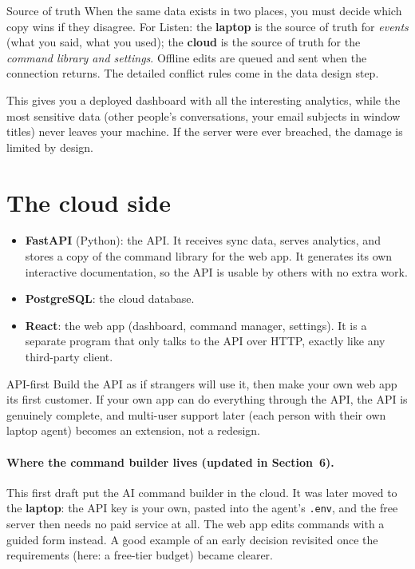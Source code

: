 \documentclass[11pt,a4paper]{article}
\begin{document}
\begin{concept}{Source of truth}
When the same data exists in two places, you must decide which copy wins if they disagree.
For Listen: the \textbf{laptop} is the source of truth for \emph{events} (what you said,
what you used); the \textbf{cloud} is the source of truth for the \emph{command library and
settings}. Offline edits are queued and sent when the connection returns. The detailed
conflict rules come in the data design step.
\end{concept}

\begin{why}
This gives you a deployed dashboard with all the interesting analytics, while the most
sensitive data (other people's conversations, your email subjects in window titles) never
leaves your machine. If the server were ever breached, the damage is limited by design.
\end{why}

\section{The cloud side}

\begin{itemize}
  \item \textbf{FastAPI} (Python): the API. It receives sync data, serves analytics,
        and stores a copy of the command library for the web app. It generates its own
        interactive documentation, so the API is usable by others with no extra work.
  \item \textbf{PostgreSQL}: the cloud database.
  \item \textbf{React}: the web app (dashboard, command manager, settings). It is a separate
        program that only talks to the API over HTTP, exactly like any third-party client.
\end{itemize}

\begin{concept}{API-first}
Build the API as if strangers will use it, then make your own web app its first customer.
If your own app can do everything through the API, the API is genuinely complete, and
multi-user support later (each person with their own laptop agent) becomes an extension,
not a redesign.
\end{concept}

\paragraph{Where the command builder lives (updated in Section~6).} This first draft put the AI
command builder in the cloud. It was later moved to the \textbf{laptop}: the API key is your own,
pasted into the agent's \texttt{.env}, and the free server then needs no paid service at all.
The web app edits commands with a guided form instead. A good example of an early decision
revisited once the requirements (here: a free-tier budget) became clearer.
\end{document}
